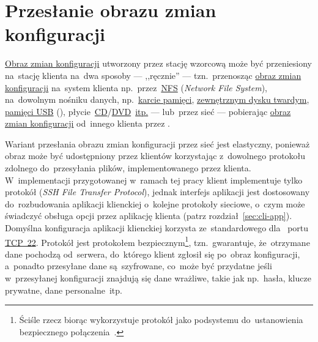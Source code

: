 \documentclass[thesis]{subfiles}
\begin{document}

\section{Przesłanie obrazu zmian konfiguracji}
\label{sec:przeslanie-obrazu-konfiguracji}

\hyperref[sec:obraz-zmian-konfiguracji]{Obraz zmian konfiguracji} utworzony przez stację wzorcową może być przeniesiony na~stację klienta na~dwa sposoby --- ,,ręcznie'' --- tzn.~przenosząc \hyperref[sec:obraz-zmian-konfiguracji]{obraz zmian konfiguracji} na~system klienta np.~przez~\href{https://en.wikipedia.org/wiki/Network_File_System}{NFS} (\emph{Network File System}), na~dowolnym nośniku danych, np.~\href{https://en.wikipedia.org/wiki/Memory_card}{karcie pamięci}, \href{https://en.wikipedia.org/wiki/Hard_disk_drive\#External_hard_disk_drives}{zewnętrznym dysku twardym}, \href{https://en.wikipedia.org/wiki/USB_flash_drive}{pamięci USB} (), płycie~\href{https://en.wikipedia.org/wiki/Compact_disc}{CD}/\href{https://en.wikipedia.org/wiki/DVD}{DVD}~\href{https://en.wikipedia.org/wiki/USB_mass_storage_device_class}{itp.} --- lub~przez sieć --- pobierając \hyperref[sec:obraz-zmian-konfiguracji]{obraz zmian konfiguracji} od~innego klienta przez \sftp{}.

Wariant przesłania obrazu zmian konfiguracji przez sieć jest elastyczny, ponieważ obraz może być udostępniony przez klientów korzystając z~dowolnego protokołu zdolnego do~przesyłania plików, implementowanego przez klienta. W~implementacji przygotowanej w~ramach tej pracy klient implementuje tylko protokół \sftp{} (\emph{SSH File Transfer Protocol}), jednak interfejs aplikacji jest dostosowany do~rozbudowania aplikacji klienckiej o~kolejne protokoły sieciowe, o~czym może świadczyć obsługa opcji  przez aplikację klienta (patrz rozdział~\ref{sec:cli-app}). Domyślna konfiguracja aplikacji klienckiej korzysta ze~standardowego dla~\sftp{} portu \href{https://www.iana.org/assignments/service-names-port-numbers/service-names-port-numbers.xhtml?search=22}{TCP~22}. Protokół \sftp{} jest protokołem bezpiecznym\footnote{Ściśle rzecz biorąc \sftp{} wykorzystuje protokół \ssh{} jako podsystemu do~ustanowienia bezpiecznego połączenia~\cite{rfc:sftp}.}, tzn.~gwarantuje, że~otrzymane dane pochodzą od~serwera, do~którego klient zgłosił się po~obraz konfiguracji, a~ponadto przesyłane dane są~szyfrowane, co~może być przydatne jeśli w~przesyłanej konfiguracji znajdują się dane wrażliwe, takie jak np.~hasła, klucze prywatne, dane personalne~itp.~\cite{rfc:sftp}
\end{document}
